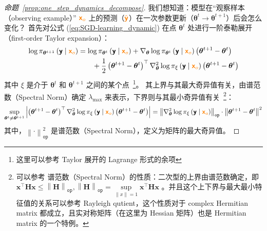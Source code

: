 \documentclass[citestyle=gb7714-2015, bibstyle=gb7714-2015,lang=cn,14pt,scheme=chinese]{elegantbook}
\begin{document}
\begin{proof}[命题~\ref{prop:one_step_dynamics_decompose}]
我们想知道：模型在“观察样本（observing example）” \(\textcolor{orange}{\bm{\mathsf{x}}_{o}}\) 上的预测（\(\textcolor{orange}{\hat{\bm{\mathsf{y}}}}\)）在一次参数更新（\(\bm{\theta}^{t} \to \bm{\theta}^{t+1}\)）后会怎么变化？
首先对公式 (\ref{eq:SGD-learning_dynamic}) 在点 \(\bm{\theta}^{t}\) 处进行一阶泰勒展开（first-order Taylor expansion）：
\begin{equation}\label{eq:SGD-learning_dynamic_taylor_expansion}
\begin{aligned}
    \log \pi_{\bm{\theta}^{t+1}} \left( \bm{\mathsf{y}} \mid \textcolor{orange}{\bm{\mathsf{x}}_{o}} \right) &= \log \pi_{\bm{\theta}^{t}} \left( \bm{\mathsf{y}} \mid \textcolor{orange}{\bm{\mathsf{x}}_{o}} \right) + \nabla_{\bm{\theta}} \log \pi_{\bm{\theta}^{t}} \left( \bm{\mathsf{y}} \mid \textcolor{orange}{\bm{\mathsf{x}}_{o}} \right) \left( \bm{\theta}^{t+1} - \bm{\theta}^{t} \right) \\
    & \qquad + \frac{1}{2} \left( \bm{\theta}^{t+1} - \bm{\theta}^{t} \right)^{\top} \nabla_{\bm{\theta}}^{2} \log \pi_{\xi} \left( \bm{\mathsf{y}} \mid \textcolor{orange}{\bm{\mathsf{x}}_{o}} \right) \left( \bm{\theta}^{t+1} - \bm{\theta}^{t} \right)
\end{aligned}
\end{equation}
其中 \(\xi\) 是介于 \(\bm{\theta}^{t}\) 和 \(\bm{\theta}^{t+1}\) 之间的某个点~\footnote{这里可以参考 Taylor 展开的 Lagrange 形式的余项}。
其上界与其最大奇异值有关，由谱范数（Spectral Norm）确定 \(\lambda_{\max}\) 来表示，下界则与其最小奇异值有关~\footnote{可以参考 谱范数（Spectral Norm）的性质：二次型的上界由谱范数确定，即 \(\bm{x}^{\top} \mathbf{H} \bm{x} \leq \left\| \mathbf{H} \right\|_{\texttt{op}}, \left\| \mathbf{H} \right\|_{\texttt{op}} = \underset{\left\|x\right\| = 1}{\sup} \bm{x}^{\top} \mathbf{H} \bm{x}\) 。并且这个上下界与最大最小特征值的关系可以参考 Rayleigh qutient，这个性质对于 complex Hermitian matrix 都成立，且实对称矩阵（在这里为 Hessian 矩阵）也是 Hermitian matrix 的一个特例。}：
\[
    \underset{\bm{\theta}^{t} \neq \bm{\theta}^{t+1}}{\sup} \left| \left( \bm{\theta}^{t+1} - \bm{\theta}^{t} \right)^{\top} \nabla_{\bm{\theta}}^{2} \log \pi_{\xi} \left( \bm{\mathsf{y}} \mid \textcolor{orange}{\bm{\mathsf{x}}_{o}} \right) \left( \bm{\theta}^{t+1} - \bm{\theta}^{t} \right) \right| = \left\| \nabla_{\bm{\theta}}^{2} \log \pi_{\xi} \left( \bm{\mathsf{y}} \mid \textcolor{orange}{\bm{\mathsf{x}}_{o}} \right) \right\|_{\texttt{op}} \cdot \left\| \bm{\theta}^{t+1} - \bm{\theta}^{t} \right\|^{2}
\]
其中，\(\left\| \cdot \right\|^{2}_{\texttt{op}}\) 是谱范数（Spectral Norm），定义为矩阵的最大奇异值。


\end{proof}
\end{document}
